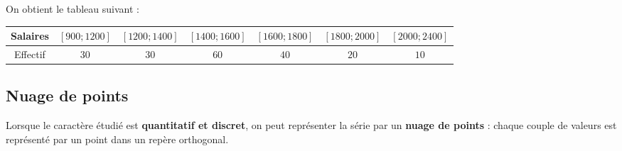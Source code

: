 \documentclass[10pt,a4paper,openany,twoside, eleve]{book}
\begin{document}
\begin{ex}{}{}
On obtient le tableau suivant :
\begin{center}
\begin{tabular}{|*{7}{c|}}
\hline
Salaires & $[900;1200]$ &$[1200;1400]$& $[1400;1600]$ &$[1600;1800]$ & $[1800;2000]$ & $[2000;2400]$ \\\hline
Effectif & $30$ & $30$ & $60$ & $40$ & $20$ & $10$ \\\hline
\end{tabular}
\end{center}
\end{ex}

\newpage
\subsection{Nuage de points}

   Lorsque le caractère étudié est \textbf{quantitatif et discret}, on peut représenter la série par un \textbf{nuage de points} : chaque couple de valeurs est représenté par un point dans un repère orthogonal.
\end{document}
